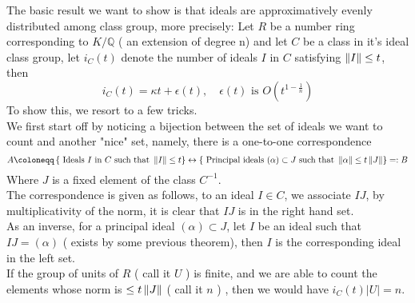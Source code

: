 \documentclass[../main.tex]{subfiles}
\begin{document}
The basic result we want to show is that ideals are approximatively evenly distributed among class group, more precisely:
Let $R$ be a number ring corresponding to $K / \mathbb{Q}$ ( an extension of degree n) and let $C$ be a class in it's ideal class group, let $i_C( t) $ denote the number of ideals $I$  in $C$ satisfying $ \left\lVert I\right\rVert \leq t$, then
\[ 
i_C( t) = \kappa t + \epsilon( t) , \quad \epsilon ( t) \text{ is } O( t^{1-\frac{1}{n}}) 
\]
To show this, we resort to a few tricks.\\
We first start off by noticing a bijection between the set of ideals we want to count and another "nice" set, namely, there is a one-to-one correspondence
\[ 
A \coloneqq \left\{ \text{ Ideals $I$ in $C$ such that } \N I \leq t \right\} \leftrightarrow \left\{ \text{ Principal ideals $( \alpha) \subset J$ such that } \N \alpha \leq t \N J \right\} = :B
\]
Where $J$ is a fixed element of the class $C^{-1}$.\\
The correspondence is given as follows, to an ideal  $I \in C$, we associate $ IJ$, by multiplicativity of the norm, it is clear that $IJ$ is in the right hand set.\\
As an inverse, for a principal ideal $( \alpha) \subset J$, let $I$ be an ideal such that $IJ = ( \alpha) $ ( exists by some previous theorem), then $I$ is the corresponding ideal in the left set.\\
If the group of units of $R$ ( call it $U$ ) is finite, and we are able to count the elements whose norm is $ \leq t \left\lVert J\right\rVert$ ( call it $n$ ) , then we would have  $i_C( t) |U| =n $.\\
\end{document}

